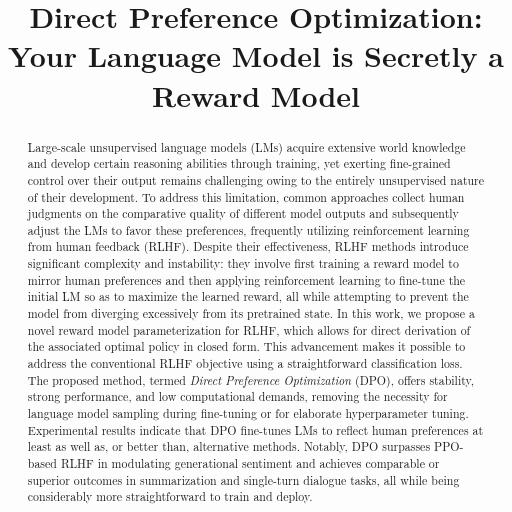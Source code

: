 \title{Direct Preference Optimization: Your Language Model is Secretly a Reward Model}

\begin{abstract}
Large-scale unsupervised language models (LMs) acquire extensive world knowledge and develop certain reasoning abilities through training, yet exerting fine-grained control over their output remains challenging owing to the entirely unsupervised nature of their development. To address this limitation, common approaches collect human judgments on the comparative quality of different model outputs and subsequently adjust the LMs to favor these preferences, frequently utilizing reinforcement learning from human feedback (RLHF). Despite their effectiveness, RLHF methods introduce significant complexity and instability: they involve first training a reward model to mirror human preferences and then applying reinforcement learning to fine-tune the initial LM so as to maximize the learned reward, all while attempting to prevent the model from diverging excessively from its pretrained state. In this work, we propose a novel reward model parameterization for RLHF, which allows for direct derivation of the associated optimal policy in closed form. This advancement makes it possible to address the conventional RLHF objective using a straightforward classification loss. The proposed method, termed \textit{Direct Preference Optimization} (DPO), offers stability, strong performance, and low computational demands, removing the necessity for language model sampling during fine-tuning or for elaborate hyperparameter tuning. Experimental results indicate that DPO fine-tunes LMs to reflect human preferences at least as well as, or better than, alternative methods. Notably, DPO surpasses PPO-based RLHF in modulating generational sentiment and achieves comparable or superior outcomes in summarization and single-turn dialogue tasks, all while being considerably more straightforward to train and deploy.
\end{abstract}


